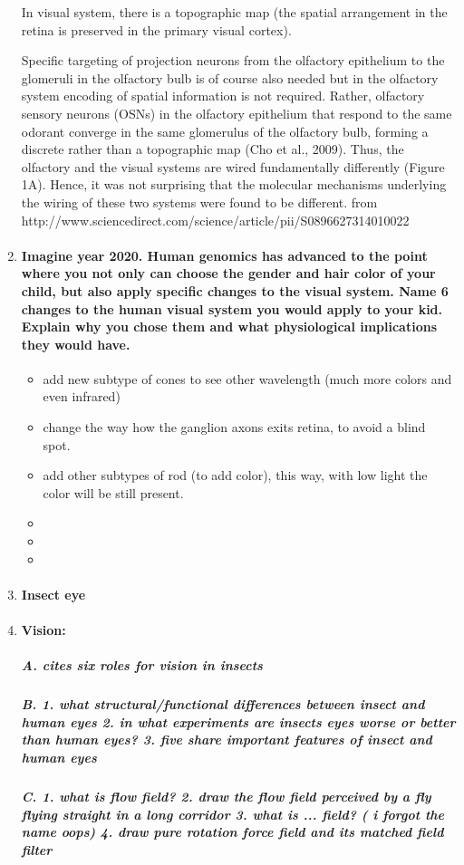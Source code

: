 \documentclass[12pt,article,oneside,a4paper]{memoir}
\begin{document}
\begin{enumerate}
In visual system, there is a topographic map (the spatial arrangement in the retina is preserved in the primary visual cortex).

Specific targeting of projection neurons from the olfactory epithelium to the glomeruli
in the olfactory bulb is of course also needed but in the olfactory system encoding of
spatial information is not required. Rather, olfactory sensory neurons (OSNs) in the
olfactory epithelium that respond to the same odorant converge in the same
glomerulus of the olfactory bulb, forming a discrete rather than a topographic map
(Cho et al., 2009). Thus, the olfactory and the visual systems are wired
fundamentally differently (Figure 1A). Hence, it was not surprising that the molecular
mechanisms underlying the wiring of these two systems were found to be different.
from http://www.sciencedirect.com/science/article/pii/S0896627314010022

\item \paragraph{Imagine year 2020. Human genomics has advanced to the point where you
not only can choose the gender and hair color of your child, but also apply specific
changes to the visual system. Name 6 changes to the human visual system you would apply to your kid. Explain why you chose them and what physiological implications they would have.}

\begin{itemize}
\item add new subtype of cones to see other wavelength (much more colors and even infrared)
\item change the way how the ganglion axons exits retina, to avoid a blind spot.
\item add other subtypes of rod (to add color), this way, with low light the color will be still present.
\item 
\item
\item
\end{itemize}

\item \paragraph{Insect eye} 

\item \paragraph{Vision:}
\subparagraph{A. cites six roles for vision in insects}
\subparagraph{B. 1. what structural/functional differences between insect and human eyes 2. in what experiments are insects eyes worse or better than human eyes? 3. five share important features of insect and human eyes}
\subparagraph{C. 1. what is flow field? 2. draw the flow field perceived by a fly flying straight in a long corridor 3. what is ... field? ( i forgot the name oops) 4. draw pure rotation force field and its matched field filter}
\end{enumerate}
\end{document}
